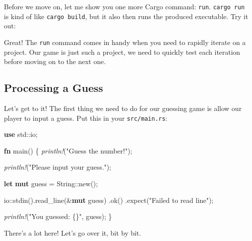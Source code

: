 \documentclass[a4paper,]{book}
\newenvironment{Shaded}{\begin{snugshade}}{\end{snugshade}}
\newcommand{\KeywordTok}[1]{\textcolor[rgb]{0.13,0.29,0.53}{\textbf{{#1}}}}
\newcommand{\DataTypeTok}[1]{\textcolor[rgb]{0.13,0.29,0.53}{{#1}}}
\newcommand{\StringTok}[1]{\textcolor[rgb]{0.31,0.60,0.02}{{#1}}}
\newcommand{\PreprocessorTok}[1]{\textcolor[rgb]{0.56,0.35,0.01}{\textit{{#1}}}}
\newcommand{\NormalTok}[1]{{#1}}
\begin{document}
Before we move on, let me show you one more Cargo command: \texttt{run}.
\texttt{cargo\ run} is kind of like \texttt{cargo\ build}, but it also
then runs the produced executable. Try it out:

\begin{Shaded}
\end{Shaded}

Great! The \texttt{run} command comes in handy when you need to rapidly
iterate on a project. Our game is just such a project, we need to
quickly test each iteration before moving on to the next one.

\subsection{Processing a Guess}\label{processing-a-guess}

Let's get to it! The first thing we need to do for our guessing game is
allow our player to input a guess. Put this in your
\texttt{src/main.rs}:

\begin{Shaded}
\begin{Highlighting}[]
\KeywordTok{use} \NormalTok{std::io;}

\KeywordTok{fn} \NormalTok{main() \{}
    \PreprocessorTok{println!}\NormalTok{(}\StringTok{"Guess the number!"}\NormalTok{);}

    \PreprocessorTok{println!}\NormalTok{(}\StringTok{"Please input your guess."}\NormalTok{);}

    \KeywordTok{let} \KeywordTok{mut} \NormalTok{guess = }\DataTypeTok{String}\NormalTok{::new();}

    \NormalTok{io::stdin().read_line(&}\KeywordTok{mut} \NormalTok{guess)}
        \NormalTok{.ok()}
        \NormalTok{.expect(}\StringTok{"Failed to read line"}\NormalTok{);}

    \PreprocessorTok{println!}\NormalTok{(}\StringTok{"You guessed: \{\}"}\NormalTok{, guess);}
\NormalTok{\}}
\end{Highlighting}
\end{Shaded}

There's a lot here! Let's go over it, bit by bit.
\end{document}
